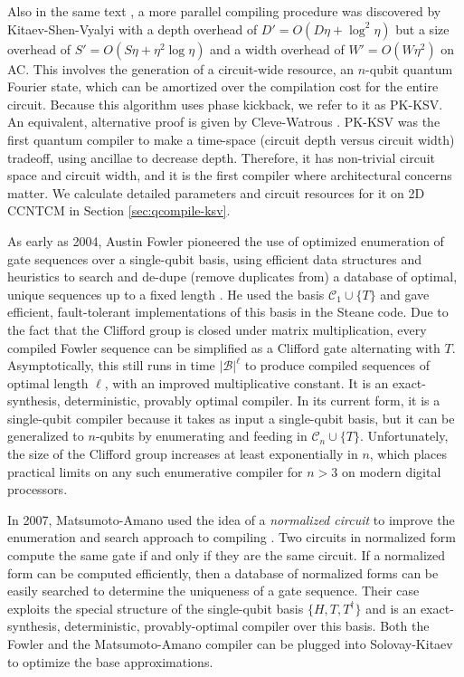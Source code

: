 Also in the same text \cite{Kitaev2002},
a more parallel compiling procedure was discovered by Kitaev-Shen-Vyalyi
with a depth overhead of $D' = O(D\eta + \log^2\eta)$ but
a size overhead of $S' = O(S\eta + \eta^2 \log\eta)$
and a width overhead of $W' = O(W\eta^2)$
on \textsf{AC}.
This involves the generation of a circuit-wide resource,
an $n$-qubit quantum Fourier state, which can be amortized over the compilation
cost for the entire circuit. Because this algorithm uses phase kickback,
we refer to it as PK-KSV.
An equivalent, alternative proof is given by Cleve-Watrous \cite{Cleve2000}.
PK-KSV was the first quantum compiler to make a time-space (circuit depth
versus circuit width) tradeoff,
using ancillae to decrease depth. Therefore, it has non-trivial circuit space
and circuit width, and it is the first compiler where architectural concerns
matter.
We calculate detailed parameters and circuit resources for it on
\textsf{2D CCNTCM} in Section \ref{sec:qcompile-ksv}.


As early as 2004, Austin Fowler pioneered the use of optimized enumeration
of gate sequences over a single-qubit basis, using efficient data structures
and heuristics to search and de-dupe (remove duplicates from) a database of optimal, unique
sequences up to
a fixed length \cite{Fowler2011}. He used the basis $\mathcal{C}_1 \cup \{ T \}$
and gave efficient, fault-tolerant implementations of this basis in the
Steane code. Due to the fact that the Clifford group is closed under
matrix multiplication, every compiled Fowler sequence can be simplified as a
Clifford gate alternating with $T$. Asymptotically, this still runs in time
$|\mathcal{B}|^\ell$ to produce compiled sequences of optimal length $\ell$,
with an improved multiplicative constant.
It is an exact-synthesis, deterministic, provably optimal compiler.
In its current form, it is a single-qubit compiler because it takes as input
a single-qubit basis, but it can be generalized to $n$-qubits by enumerating
and feeding in $\mathcal{C}_n \cup \{T\}$. Unfortunately, the size of the
Clifford group increases at least exponentially in $n$, which places practical
limits on any such enumerative compiler for $n > 3$ on modern digital processors.

In 2007, Matsumoto-Amano used the idea of a \emph{normalized circuit} to
improve the enumeration and search approach to compiling \cite{Matsumoto2008}. Two circuits in
normalized form compute the same gate if and only if they are the same
circuit. If a normalized form can be computed efficiently, then a
database of normalized forms can be easily searched to determine the
uniqueness of a gate sequence. Their case exploits the special structure
of the single-qubit basis $\{H,T,T^{\dagger}\}$ and is an exact-synthesis,
deterministic, provably-optimal compiler over this basis. Both the Fowler
and the Matsumoto-Amano compiler can be plugged into Solovay-Kitaev to
optimize the base approximations.

